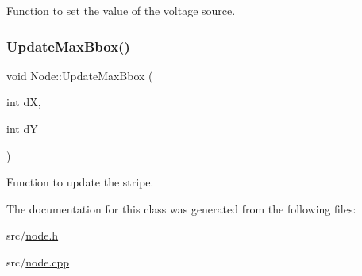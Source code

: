 Function to set the value of the voltage source. 

\mbox{\label{classNode_a58172b29bbb26738beb36ea9c4a2f448}} 
\subsubsection{\texorpdfstring{Update\+Max\+Bbox()}{UpdateMaxBbox()}}
{\footnotesize\ttfamily void Node\+::\+Update\+Max\+Bbox (\begin{DoxyParamCaption}\item[{int}]{dX,  }\item[{int}]{dY }\end{DoxyParamCaption})}



Function to update the stripe. 



The documentation for this class was generated from the following files\+:\begin{DoxyCompactItemize}
\item 
src/\hyperlink{node_8h}{node.\+h}\item 
src/\hyperlink{node_8cpp}{node.\+cpp}\end{DoxyCompactItemize}

